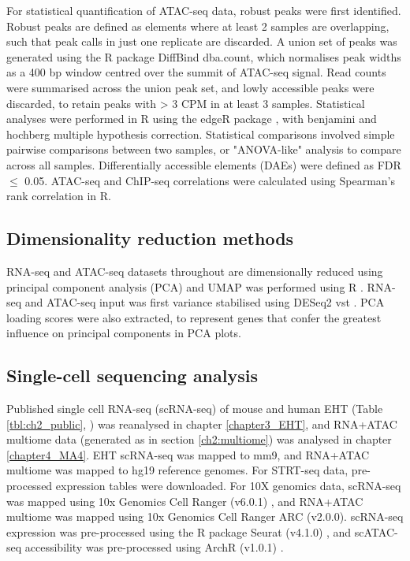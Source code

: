 For statistical quantification of ATAC-seq data, robust peaks were first identified. Robust peaks are defined as elements where at least 2 samples are overlapping, such that peak calls in just one replicate are discarded. A union set of peaks was generated using the R package DiffBind dba.count, which normalises peak widths as a 400 bp window centred over the summit of ATAC-seq signal. Read counts were summarised across the union peak set, and lowly accessible peaks were discarded, to retain peaks with > 3 CPM in at least 3 samples. Statistical analyses were performed in R using the edgeR package \citep{robinson_edger:_2010}, with benjamini and hochberg multiple hypothesis correction. Statistical comparisons involved simple pairwise comparisons between two samples, or "ANOVA-like" analysis \citep{robinson_edger:_2010} to compare across all samples. Differentially accessible elements (DAEs) were defined as FDR $\leq$ 0.05. ATAC-seq and ChIP-seq correlations were calculated using Spearman's rank correlation in R.

\subsection{\label{ch2:dimred}Dimensionality reduction methods}
RNA-seq and ATAC-seq datasets throughout are dimensionally reduced using principal component analysis (PCA) and UMAP was performed using R \citep{r_core_team_r_2021}. RNA-seq and ATAC-seq input was first variance stabilised using DESeq2 vst \citep{love_moderated_2014}. PCA loading scores were also extracted, to represent genes that confer the greatest influence on principal components in PCA plots.

\subsection{\label{ch2:single-cell}Single-cell sequencing analysis}

Published single cell RNA-seq (scRNA-seq) of mouse and human EHT (Table \ref{tbl:ch2_public}, \cite{zeng_tracing_2019, zhu_developmental_2020}) was reanalysed in chapter \ref{chapter3_EHT}, and RNA+ATAC multiome data (generated as in section \ref{ch2:multiome}) was analysed in chapter \ref{chapter4_MA4}. EHT scRNA-seq was mapped to mm9, and RNA+ATAC multiome was mapped to hg19 reference genomes. For STRT-seq data, pre-processed expression tables were downloaded. For 10X genomics data, scRNA-seq was mapped using 10x Genomics Cell Ranger (v6.0.1) \citep{zheng_massively_2017}, and RNA+ATAC multiome was mapped using 10x Genomics Cell Ranger ARC (v2.0.0). scRNA-seq expression was pre-processed using the R package Seurat (v4.1.0) \citep{hao_integrated_2021}, and scATAC-seq accessibility was pre-processed using ArchR (v1.0.1) \citep{granja_archr_2021}.

